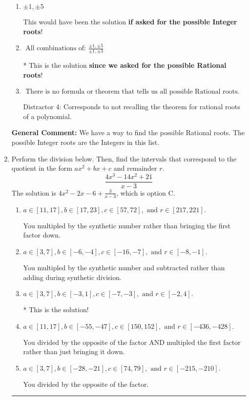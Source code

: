 \documentclass{extbook}[14pt]
\newcommand{\litem}[1]{\item #1

\rule{\textwidth}{0.4pt}}
\begin{document}
\begin{enumerate}
{\begin{enumerate}[label=\Alph*.]
 Distractor 3: Corresponds to the plus or minus of the inverse quotient (an/a0) of the factors. 
\item \( \pm 1,\pm 5 \)

This would have been the solution \textbf{if asked for the possible Integer roots}!
\item \( \text{ All combinations of: }\frac{\pm 1,\pm 5}{\pm 1,\pm 3} \)

* This is the solution \textbf{since we asked for the possible Rational roots}!
\item \( \text{ There is no formula or theorem that tells us all possible Rational roots.} \)

 Distractor 4: Corresponds to not recalling the theorem for rational roots of a polynomial.
\end{enumerate}

\textbf{General Comment:} We have a way to find the possible Rational roots. The possible Integer roots are the Integers in this list.
}
\litem{
Perform the division below. Then, find the intervals that correspond to the quotient in the form $ax^2+bx+c$ and remainder $r$.
\[ \frac{4x^{3} -14 x^{2} + 21}{x -3} \]The solution is \( 4x^{2} -2 x -6 + \frac{3}{x -3} \), which is option C.\begin{enumerate}[label=\Alph*.]
\item \( a \in [11, 17], b \in [17, 23], c \in [57, 72], \text{ and } r \in [217, 221]. \)

 You multipled by the synthetic number rather than bringing the first factor down.
\item \( a \in [3, 7], b \in [-6, -4], c \in [-16, -7], \text{ and } r \in [-8, -1]. \)

 You multipled by the synthetic number and subtracted rather than adding during synthetic division.
\item \( a \in [3, 7], b \in [-3, 1], c \in [-7, -3], \text{ and } r \in [-2, 4]. \)

* This is the solution!
\item \( a \in [11, 17], b \in [-55, -47], c \in [150, 152], \text{ and } r \in [-436, -428]. \)

 You divided by the opposite of the factor AND multipled the first factor rather than just bringing it down.
\item \( a \in [3, 7], b \in [-28, -21], c \in [74, 79], \text{ and } r \in [-215, -210]. \)

 You divided by the opposite of the factor.
\end{enumerate}

}
\end{enumerate}
\end{document}

